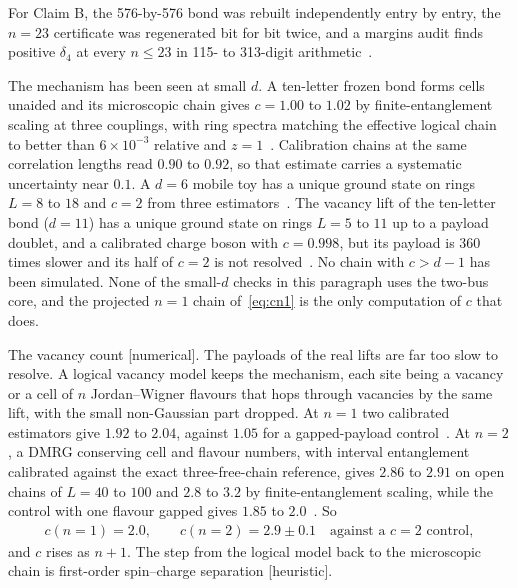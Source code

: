 \documentclass[11pt]{article}
\theoremstyle{definition}
\newcommand{\st}[1]{\textup{[\textsf{#1}]}}
\begin{document}
For Claim B, the 576-by-576 bond was rebuilt independently entry by entry, the $n=23$ certificate was regenerated bit for bit twice, and a margins audit finds positive $\delta_4$ at every $n\le23$ in 115- to 313-digit arithmetic~\cite{refd24,margins}.

The mechanism has been seen at small $d$. A ten-letter frozen bond forms cells unaided and its microscopic chain gives $c=1.00$ to $1.02$ by finite-entanglement scaling at three couplings, with ring spectra matching the effective logical chain to better than $6\times10^{-3}$ relative and $z=1$~\cite{demo,FES}. Calibration chains at the same correlation lengths read $0.90$ to $0.92$, so that estimate carries a systematic uncertainty near $0.1$. A $d=6$ mobile toy has a unique ground state on rings $L=8$ to $18$ and $c=2$ from three estimators~\cite{mobile}. The vacancy lift of the ten-letter bond ($d=11$) has a unique ground state on rings $L=5$ to $11$ up to a payload doublet, and a calibrated charge boson with $c=0.998$, but its payload is 360 times slower and its half of $c=2$ is not resolved~\cite{vacnum}. No chain with $c>d-1$ has been simulated. None of the small-$d$ checks in this paragraph uses the two-bus core, and the projected $n=1$ chain of~\eqref{eq:cn1} is the only computation of $c$ that does.

The vacancy count \st{numerical}. The payloads of the real lifts are far too slow to resolve. A logical vacancy model keeps the mechanism, each site being a vacancy or a cell of $n$ Jordan--Wigner flavours that hops through vacancies by the same lift, with the small non-Gaussian part dropped. At $n=1$ two calibrated estimators give $1.92$ to $2.04$, against $1.05$ for a gapped-payload control~\cite{vacnum}. At $n=2$, a DMRG conserving cell and flavour numbers, with interval entanglement calibrated against the exact three-free-chain reference, gives $2.86$ to $2.91$ on open chains of $L=40$ to $100$ and $2.8$ to $3.2$ by finite-entanglement scaling, while the control with one flavour gapped gives $1.85$ to $2.0$~\cite{vacn2}. So
\begin{align}
c(n=1)=2.0,\qquad c(n=2)=2.9\pm0.1\quad\text{against a } c=2 \text{ control},
\label{eq:vaccount}
\end{align}
and $c$ rises as $n+1$. The step from the logical model back to the microscopic chain is first-order spin--charge separation \st{heuristic}.
\end{document}
